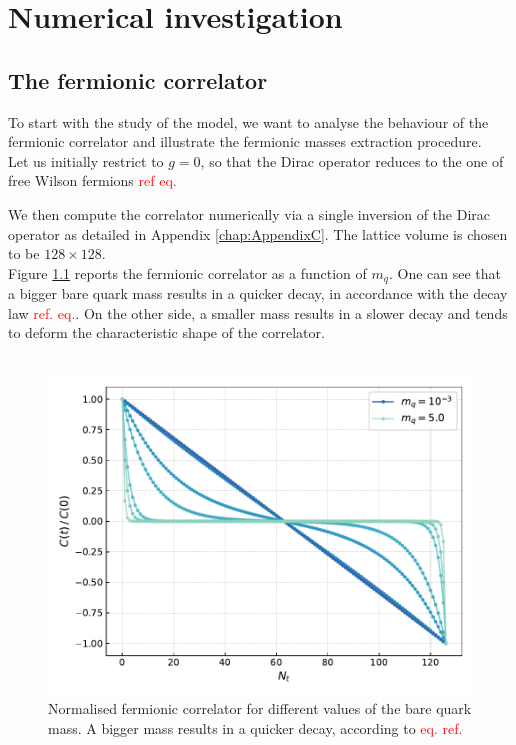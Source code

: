 \chapter{Numerical investigation}
\label{chapt:results}


\section{The fermionic correlator}
To start with the study of the model, we want to analyse the behaviour of the fermionic correlator and illustrate the fermionic masses extraction procedure. \\
Let us initially restrict to $g = 0$, so that the Dirac operator reduces to the one of free Wilson fermions \textcolor{red}{ref eq.}
\raggedright We then compute the correlator numerically via a single inversion of the Dirac operator as detailed in Appendix \ref{chap:AppendixC}. The lattice volume is chosen to be $128 \times 128$. \\
Figure \ref{fig:correlator_mass} reports the fermionic correlator as a function of $m_q$. One can see that a bigger bare quark mass results in a quicker decay, in accordance with the decay law \textcolor{red}{ref. eq.}. On the other side, a smaller mass results in a slower decay and tends to deform the characteristic shape of the correlator. \\~\\
\begin{figure}[h]
    \centering 
    \includegraphics[scale=0.6]{figures/correlator/correlator.pdf}
    \caption[Fermionic correlator]{Normalised fermionic correlator for different values of the bare quark mass. A bigger mass results in a quicker decay, according to \textcolor{red}{eq. ref.}}
    \label{fig:correlator_mass}
\end{figure}
